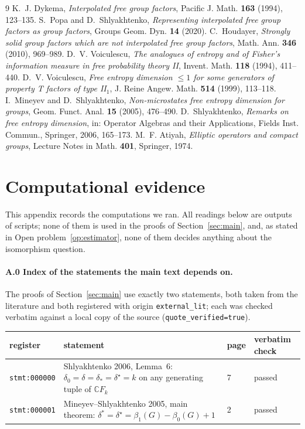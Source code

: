 \documentclass[11pt]{article}
\theoremstyle{plain}
\theoremstyle{definition}
\theoremstyle{remark}
\newcommand{\C}{\mathbb{C}}\newcommand{\N}{\mathbb{N}}
\begin{document}
\begin{thebibliography}{9}
 K.~J. Dykema, \emph{Interpolated free group factors}, Pacific J. Math. \textbf{163} (1994), 123--135.
 S.~Popa and D.~Shlyakhtenko, \emph{Representing interpolated free group factors as group factors}, Groups Geom. Dyn. \textbf{14} (2020).
 C.~Houdayer, \emph{Strongly solid group factors which are not interpolated free group factors}, Math. Ann. \textbf{346} (2010), 969--989.
 D.~V. Voiculescu, \emph{The analogues of entropy and of Fisher's information measure in free probability theory II}, Invent. Math. \textbf{118} (1994), 411--440.
 D.~V. Voiculescu, \emph{Free entropy dimension $\le1$ for some generators of property T factors of type II$_1$}, J. Reine Angew. Math. \textbf{514} (1999), 113--118.
 I.~Mineyev and D.~Shlyakhtenko, \emph{Non-microstates free entropy dimension for groups}, Geom. Funct. Anal. \textbf{15} (2005), 476--490.
 D.~Shlyakhtenko, \emph{Remarks on free entropy dimension}, in: Operator Algebras and their Applications, Fields Inst. Commun., Springer, 2006, 165--173.
 M.~F. Atiyah, \emph{Elliptic operators and compact groups}, Lecture Notes in Math. \textbf{401}, Springer, 1974.
\end{thebibliography}

\appendix
\section{Computational evidence}\label{app:comp}

This appendix records the computations we ran. All readings below are outputs of scripts; none of them is used in the proofs of Section~\ref{sec:main}, and, as stated in Open problem~\ref{op:estimator}, none of them decides anything about the isomorphism question.

\paragraph{A.0 Index of the statements the main text depends on.} The proofs of Section~\ref{sec:main} use exactly two statements, both taken from the literature and both registered with origin \texttt{external\_lit}; each was checked verbatim against a local copy of the source (\texttt{quote\_verified=true}).

\begin{center}\small
\begin{tabular}{@{}llll@{}}
\hline
register & statement & page & verbatim check \\
\hline
\texttt{stmt:000000} & Shlyakhtenko 2006, Lemma~6: $\delta_0=\delta=\delta_*=\delta^\star=k$ on any generating tuple of $\C F_k$ & 7 & passed \\
\texttt{stmt:000001} & Mineyev--Shlyakhtenko 2005, main theorem: $\delta^*=\delta^\star=\beta_1(G)-\beta_0(G)+1$ & 2 & passed \\
\hline
\end{tabular}
\end{center}
\end{document}
